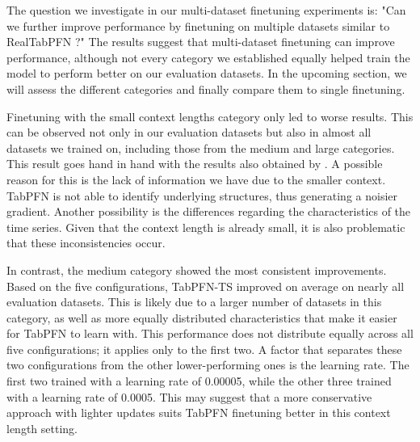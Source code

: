 The question we investigate in our multi-dataset finetuning experiments is:
"Can we further improve performance by finetuning on multiple datasets similar to RealTabPFN \citep{Hollmann_2025}?"
The results suggest that multi-dataset finetuning can improve performance, although not every category we established equally helped train the model to perform better on our evaluation datasets.
In the upcoming section, we will assess the different categories and finally compare them to single finetuning.

Finetuning with the small context lengths category only led to worse results.
This can be observed not only in our evaluation datasets but also in almost all datasets we trained on, including those from the medium and large categories.
This result goes hand in hand with the results also obtained by \citet{Hollmann_2025}.
A possible reason for this is the lack of information we have due to the smaller context.
TabPFN is not able to identify underlying structures, thus generating a noisier gradient.
\newline
Another possibility is the differences regarding the characteristics of the time series.
Given that the context length is already small, it is also problematic that these inconsistencies occur.

In contrast, the medium category showed the most consistent improvements.
Based on the five configurations, TabPFN-TS improved on average on nearly all evaluation datasets.
This is likely due to a larger number of datasets in this category, as well as more equally distributed characteristics that make it easier for TabPFN to learn with.
\newline
This performance does not distribute equally across all five configurations; it applies only to the first two.
A factor that separates these two configurations from the other lower-performing ones is the learning rate.
The first two trained with a learning rate of 0.00005, while the other three trained with a learning rate of 0.0005.
This may suggest that a more conservative approach with lighter updates suits TabPFN finetuning better in this context length setting.

